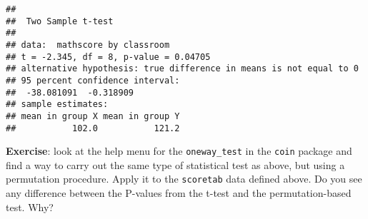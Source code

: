 \documentclass[
]{book}
\begin{document}
\begin{verbatim}
## 
##  Two Sample t-test
## 
## data:  mathscore by classroom
## t = -2.345, df = 8, p-value = 0.04705
## alternative hypothesis: true difference in means is not equal to 0
## 95 percent confidence interval:
##  -38.081091  -0.318909
## sample estimates:
## mean in group X mean in group Y 
##           102.0           121.2
\end{verbatim}

\textbf{Exercise}: look at the help menu for the \texttt{oneway\_test} in the \texttt{coin} package and find a way to carry out the same type of statistical test as above, but using a permutation procedure. Apply it to the \texttt{scoretab} data defined above. Do you see any difference between the P-values from the t-test and the permutation-based test. Why?

  
\end{document}

